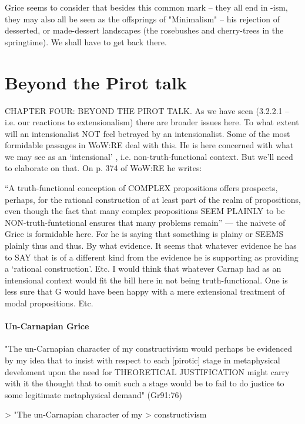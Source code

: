\documentclass[10pt,titlepage]{book}
\begin{document}
Grice seems to  consider that besides this common mark -- they all end in 
-ism, they may also  all be seen as the offsprings of "Minimalism" -- his 
rejection of desserted, or  made-dessert landscapes (the rosebushes and 
cherry-trees in the springtime). We  shall have to get back there.
 
\section{Beyond the Pirot talk}

CHAPTER  FOUR: BEYOND THE PIROT TALK.
As  we have seen (3.2.2.1 – i.e. our reactions to extensionalism) there are 
broader  issues here. To what extent will an intensionalist NOT feel 
betrayed by an  intensionalist. Some of the most formidable passages in WoW:RE 
deal with this.  He is here concerned with what we may see as an ‘intensional’
, i.e.  non-truth-functional context. But we’ll need to elaborate on that. 
On p. 374 of  WoW:RE he writes:

“A truth-functional conception of COMPLEX propositions  offers prospects, 
perhaps, for the rational construction of at least part of the  realm of 
propositions, even though the fact that many complex propositions SEEM  PLAINLY 
to be NON-truth-funtctional ensures that many problems  remain” 
---  the naivete of Grice is formidable here. For he is saying that 
something is  plainy or SEEMS plainly thus and thus. By what evidence. It seems 
that whatever  evidence he has to SAY that is of a different kind from the 
evidence he is  supporting as providing a ‘rational construction’. Etc. I would 
think that  whatever Carnap had as an intensional context would fit the 
bill here in not  being truth-functional. One is less sure that G would have 
been happy with a  mere extensional treatment of modal propositions.  Etc.
 
\paragraph{Un-Carnapian Grice}

"The un-Carnapian character of my
constructivism would perhaps  be
evidenced by my idea that to insist
with respect to each [pirotic]  stage
in metaphysical develoment
upon the need for
THEORETICAL  JUSTIFICATION
might carry with it the thought
that to omit such a  stage
would be to fail to do justice
to some legitimate
metaphysical  demand"
    (Gr91:76)
 
>  "The un-Carnapian character of my
> constructivism 
 
\end{document}
